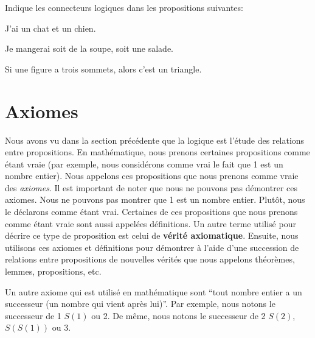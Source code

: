 \vspace{1em}

\begin{exercice}
    Indique les connecteurs logiques dans les propositions suivantes:
    \begin{exerciceenumnoeq}
        \item J'ai un chat et un chien.
        \item Je mangerai soit de la soupe, soit une salade.
        \item Si une figure a trois sommets, alors c'est un triangle.
    \end{exerciceenumnoeq}
\end{exercice}

\section{Axiomes}

Nous avons vu dans la section précédente que la logique est l'étude des relations entre propositions. En mathématique, nous prenons certaines propositions comme étant vraie (par exemple, nous considérons comme vrai le fait que 1 est un nombre entier). Nous appelons ces propositions que nous prenons comme vraie des {\em axiomes}. Il est important de noter que nous ne pouvons pas démontrer ces axiomes. Nous ne pouvons pas montrer que 1 est un nombre entier. Plutôt, nous le déclarons comme étant vrai. Certaines de ces propositions que nous prenons comme étant vraie sont aussi appelées définitions. Un autre terme utilisé pour décrire ce type de proposition est celui de \textbf{vérité axiomatique}. Ensuite, nous utilisons ces axiomes et définitions pour démontrer à l'aide d'une succession de relations entre propositions de nouvelles vérités que nous appelons théorèmes, lemmes, propositions, etc.

\begin{exemple}\label{concepts_de_base:axiomes_ex}
    Un autre axiome qui est utilisé en mathématique sont ``tout nombre entier a un successeur (un nombre qui vient après lui)''. Par exemple, nous notons le successeur de 1 $S(1)$ ou 2. De même, nous notons le successeur de 2 $S(2)$, $S(S(1))$ ou 3.
\end{exemple}

